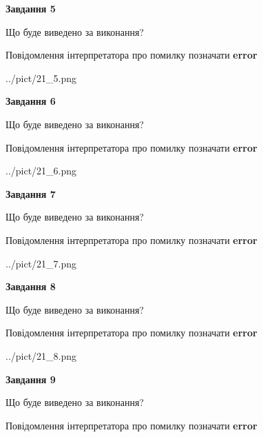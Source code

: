 \documentclass[11pt, ukrainian]{article}
\begin{document}
{\begin {large}
{\begin {center}\textbf{Завдання 5}\end {center}}\par
Що буде виведено за виконання? \par
Повідомлення інтерпретатора про помилку позначати \textbf{error}

\begin{center}
	{../pict/21_5.png}
\end{center}
\newpage

{\begin {center}\textbf{Завдання 6}\end {center}}\par
Що буде виведено за виконання? \par
Повідомлення інтерпретатора про помилку позначати \textbf{error}

\begin{center}
	{../pict/21_6.png}
\end{center}
\newpage

{\begin {center}\textbf{Завдання 7}\end {center}}\par
Що буде виведено за виконання? \par
Повідомлення інтерпретатора про помилку позначати \textbf{error}

\begin{center}
	{../pict/21_7.png}
\end{center}
\newpage

{\begin {center}\textbf{Завдання 8}\end {center}}\par
Що буде виведено за виконання? \par
Повідомлення інтерпретатора про помилку позначати \textbf{error}

\begin{center}
	{../pict/21_8.png}
\end{center}
\newpage

{\begin {center}\textbf{Завдання 9}\end {center}}\par
Що буде виведено за виконання? \par
Повідомлення інтерпретатора про помилку позначати \textbf{error}


\end{large}}
\end{document}
